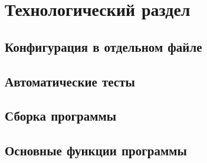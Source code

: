 \documentclass[a4paper,12pt]{report}
\begin{document}
\chapter{Технологический раздел}


\section{Конфигурация в отдельном файле}

\section{Автоматические тесты}

\section{Сборка программы}





\section{Основные функции программы}


% 

% 
% 
% 
% 
% 
% 
% 
% 
% 
% 
\end{document}
